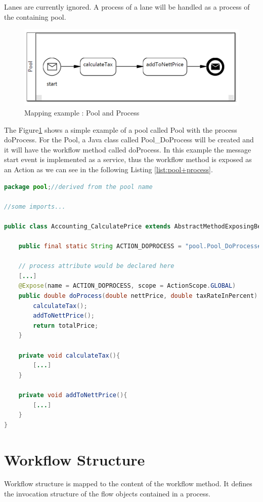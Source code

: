 Lanes are currently ignored. A process of a lane will be handled as a process of the containing pool.

\begin{figure}[h]
	\centering
		\includegraphics[width=1.0\textwidth]{images/mapping/pool_and_process.png}
	\caption{Mapping example : Pool and Process}
	\label{fig:pool+process}
\end{figure}

The Figure\ref{fig:pool+process} shows a simple example of a pool called Pool with the process doProcess. For the Pool, a Java class called Pool\_DoProcess will be created and it will have the workflow method called doProcess. In this example the message start event is implemented as a service, thus the workflow method is exposed as an Action as we can see in the following Listing \ref{list:pool+process}.  
\begin{lstlisting}[language = Java, caption =  Mapped element: Pool and Process (Figure \ref{fig:pool+process}), label = list:pool+process]
package pool;//derived from the pool name

//some imports...

public class Accounting_CalculatePrice extends AbstractMethodExposingBean{
	
	public final static String ACTION_DOPROCESS = "pool.Pool_DoProcess#doProcess"; 
	
	// process attribute would be declared here
	[...]
	@Expose(name = ACTION_DOPROCESS, scope = ActionScope.GLOBAL)
	public double doProcess(double nettPrice, double taxRateInPercent) {
		calculateTax();
		addToNettPrice();
		return totalPrice;
	}
	
	private void calculateTax(){
		[...]
	}
	
	private void addToNettPrice(){
		[...]
	}
}
\end{lstlisting}
\section{Workflow Structure}
Workflow structure is mapped to the content of the workflow method. It defines the invocation structure of the flow objects contained in a process.

